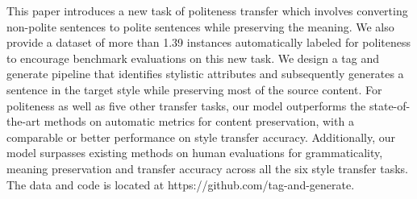 This paper introduces a new task of politeness transfer which involves converting non-polite sentences to polite sentences while preserving the meaning. We also provide a dataset of more than 1.39  instances automatically labeled for politeness to encourage benchmark evaluations on this new task. We design a tag and generate pipeline that identifies stylistic attributes and subsequently generates a sentence in the target style while preserving most of the source content. For politeness as well as five other transfer tasks, our model outperforms the state-of-the-art methods on automatic metrics for content preservation, with a  comparable or better performance on style transfer accuracy. Additionally, our model surpasses existing methods on human evaluations for grammaticality, meaning preservation and transfer accuracy across all the six style transfer tasks. The data and code is located at  https://github.com/tag-and-generate.
